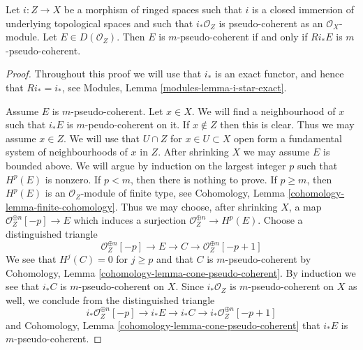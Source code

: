 \begin{lemma}
\label{lemma-closed-push-pseudo-coherent}
Let $i : Z \to X$ be a morphism of ringed spaces such that
$i$ is a closed immersion of underlying topological spaces and such that
$i_*\mathcal{O}_Z$ is pseudo-coherent as an $\mathcal{O}_X$-module.
Let $E \in D(\mathcal{O}_Z)$. Then $E$ is $m$-pseudo-coherent
if and only if $Ri_*E$ is $m$-pseudo-coherent.
\end{lemma}

\begin{proof}
Throughout this proof we will use that $i_*$ is an exact functor, and
hence that $Ri_* = i_*$, see Modules, Lemma \ref{modules-lemma-i-star-exact}.

\medskip\noindent
Assume $E$ is $m$-pseudo-coherent. Let $x \in X$. We will find a neighbourhood
of $x$ such that $i_*E$ is $m$-peudo-coherent on it. If $x \not \in Z$
then this is clear. Thus we may assume $x \in Z$. We will use
that $U \cap Z$ for $x \in U \subset X$ open form a fundamental system of
neighbourhoods of $x$ in $Z$. After shrinking $X$ we may assume $E$ is
bounded above. We will argue by induction on
the largest integer $p$ such that $H^p(E)$ is nonzero. If $p < m$, then
there is nothing to prove. If $p \geq m$, then $H^p(E)$ is an
$\mathcal{O}_Z$-module of finite type, see
Cohomology, Lemma \ref{cohomology-lemma-finite-cohomology}.
Thus we may choose, after shrinking $X$, a map
$\mathcal{O}_Z^{\oplus n}[-p] \to E$ which induces a surjection
$\mathcal{O}_Z^{\oplus n} \to H^p(E)$. Choose a distinguished triangle
$$
\mathcal{O}_Z^{\oplus n}[-p] \to E \to C \to \mathcal{O}_Z^{\oplus n}[-p + 1]
$$
We see that $H^j(C) = 0$ for $j \geq p$ and that $C$ is $m$-pseudo-coherent
by Cohomology, Lemma \ref{cohomology-lemma-cone-pseudo-coherent}.
By induction we see that $i_*C$ is $m$-pseudo-coherent on $X$.
Since $i_*\mathcal{O}_Z$ is $m$-pseudo-coherent on $X$ as well, we conclude
from the distinguished triangle
$$
i_*\mathcal{O}_Z^{\oplus n}[-p] \to i_*E \to i_*C \to
i_*\mathcal{O}_Z^{\oplus n}[-p + 1]
$$
and 
Cohomology, Lemma \ref{cohomology-lemma-cone-pseudo-coherent}
that $i_*E$ is $m$-pseudo-coherent.


\end{proof}
